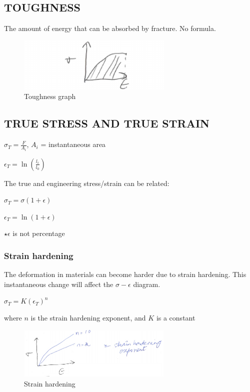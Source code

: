 \documentclass{article}
\begin{document}
\subsection{TOUGHNESS}
The amount of energy that can be absorbed by fracture. No formula.
\begin{figure}[h!]
	\centering
	\includegraphics[width=0.66\textwidth]{assets/f2e471df.png}
	\caption{Toughness graph}
\end{figure}

\subsection{TRUE STRESS AND TRUE STRAIN}

$\sigma_T = \frac{F}{A_i}$, $A_i$ = instantaneous area

$\epsilon_T = \ln(\frac{l_i}{l_0})$

The true and engineering stress/strain can be related:

$\sigma_T = \sigma(1+\epsilon)$

$\epsilon_T = \ln(1+\epsilon)$

$\star \epsilon$ is not percentage

\subsubsection{Strain hardening}
The deformation in materials can become harder due to strain hardening. This instantaneous change will affect the $\sigma-\epsilon$ diagram.

$\sigma_T = K(\epsilon_T)^n$

where $n$ is the strain hardening exponent, and $K$ is a constant

\begin{figure}[h!]
	\centering
	\includegraphics[width=0.66\textwidth]{assets/1aa4dbd7.png}
	\caption{Strain hardening}
\end{figure}
\end{document}
